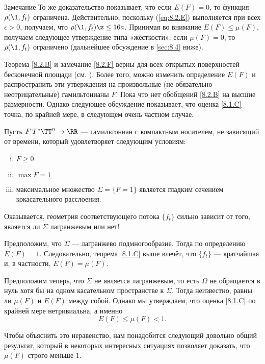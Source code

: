 \begin{thm}{Замечание}\label{8.2.F}
То же доказательство показывает, что если $E (F) = 0$, то функция $\rho (\1, f_t)$ ограничена.
Действительно, поскольку (\ref{eq:8.2.E}) выполняется при всех $\epsilon> 0$, получаем, что $\rho (\1, f_t) \z\le 16a$.
Принимая во внимание $E (F) \le \mu (F)$, получаем следующее утверждение типа «жёсткости»: если $\mu (F) = 0$, то $\rho (\1, f_t)$ ограничено (дальнейшее обсуждение в \ref{sec:8.4} ниже).
\end{thm}

Теорема \ref{8.2.B} и замечание \ref{8.2.F} верны для всех открытых поверхностей бесконечной площади (см. \cite{PS}).
Более того, можно изменить определение $E (F)$ и распространить эти утверждения на произвольные (не обязательно неотрицательные) гамильтонианы $F$.
Пока что нет обобщений \ref{8.2.B} на высшие размерности.
Однако следующее обсуждение показывает, что оценка \ref{8.1.C} точна, по крайней мере, в следующем очень частном случае.

Пусть $F\: T^\ast \TT^n \to \RR$ --- гамильтониан с компактным носителем, не зависящий от времени, который удовлетворяет следующим условиям: 
\begin{enumerate}[(i)]
\item $F \ge 0 $
\item $\max F = 1$ 
\item максимальное множество $\Sigma = \{F = 1\}$ является гладким сечением кокасательного расслоения.
\end{enumerate}

Оказывается, геометрия соответствующего потока $\{f_t\}$ сильно зависит от того, является ли $\Sigma$ лагранжевым или нет!

Предположим, что $\Sigma$ --- лагранжево подмногообразие.
Тогда по определению $E (F) = 1$.
Следовательно, теорема \ref{8.1.C} выше влечёт, что $\{f_t\}$ --- кратчайшая и, в частности, $E (F) = \mu (F)$.

Предположим теперь, что $\Sigma$ не является лагранжевым, то есть $\Omega$ не обращается в нуль хотя бы на одном касательном пространстве к $\Sigma$.
Тогда неизвестно, равны ли $\mu (F)$ и $E (F)$ между собой.
Однако мы утверждаем, что оценка \ref{8.1.C} по крайней мере нетривиальна, а именно 
\begin{equation}
E (F) \le \mu (F) <1.\label{8.2.G}
\end{equation}

Чтобы объяснить это неравенство, нам понадобится следующий довольно общий результат, который в некоторых интересных ситуациях позволяет доказать, что $\mu (F)$ строго меньше $1$.

